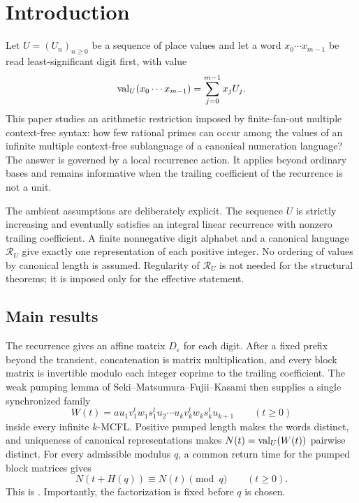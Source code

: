 \section{Introduction}\label{sec:introduction}

Let \(U=(U_n)_{n\ge0}\) be a sequence of place values and let a word
\(x_0\cdots x_{m-1}\) be read least-significant digit first, with value
\[
  \operatorname{val}_U(x_0\cdots x_{m-1})=\sum_{j=0}^{m-1}x_jU_j.
\]
This paper studies an arithmetic restriction imposed by finite-fan-out
multiple context-free syntax: how few rational primes can occur among the
values of an infinite multiple context-free sublanguage of a canonical
numeration language? The answer is governed by a local recurrence action.
It applies beyond ordinary bases and remains informative when the trailing
coefficient of the recurrence is not a unit.

The ambient assumptions are deliberately explicit. The sequence \(U\) is
strictly increasing and eventually satisfies an integral linear recurrence
with nonzero trailing coefficient. A finite nonnegative digit alphabet and
a canonical language \(\mathcal R_U\) give exactly one representation of
each positive integer. No ordering of values by canonical length is assumed.
Regularity of \(\mathcal R_U\) is not needed for the structural theorems; it
is imposed only for the effective statement.

\subsection{Main results}

The recurrence gives an affine matrix \(D_\varepsilon\) for each digit.
After a fixed prefix beyond the transient, concatenation is matrix
multiplication, and every block matrix is invertible modulo each integer
coprime to the trailing coefficient. The weak pumping lemma of
Seki--Matsumura--Fujii--Kasami then supplies a single synchronized family
\[
  W(t)=a u_1v_1^tw_1s_1^tu_2\cdots
       u_kv_k^tw_ks_k^tu_{k+1}\qquad(t\ge0)
\]
inside every infinite \(k\)-MCFL. Positive pumped length makes the words
distinct, and uniqueness of canonical representations makes
\(N(t)=\operatorname{val}_U(W(t))\) pairwise distinct. For every admissible
modulus \(q\), a common return time for the pumped block matrices gives
\[
  N(t+H(q))\equiv N(t)\pmod q\qquad(t\ge0).
\]
This is . Importantly, the
factorization is fixed before \(q\) is chosen.

